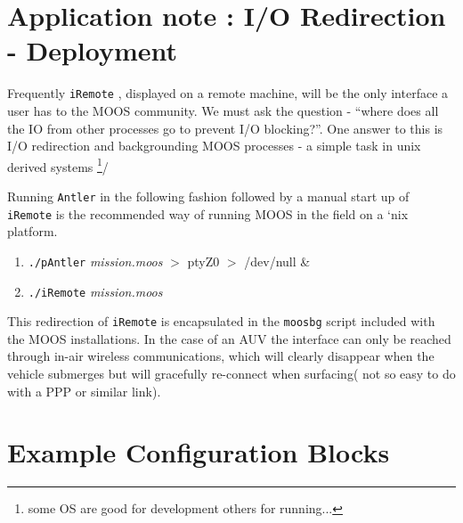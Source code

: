 \documentclass[a4paper,10pt]{article}
\newcommand{\Code}[1]{\texttt{#1} }
\newcommand{\code}[1]{\Code{#1} }
\begin{document}
\section{Application note : I/O Redirection - Deployment} 
Frequently \code{iRemote}, displayed on a remote machine, will be
the only interface a user has to the MOOS community.  We
must ask the question -  ``where does all the IO from other
processes go to prevent I/O blocking?''. One answer to this is I/O
redirection and backgrounding MOOS processes - a simple task in
unix derived systems \footnote{some OS are good for development
others for running...}/

Running \code{Antler} in the following fashion followed by a
manual start up of \code{iRemote} is the recommended way of
running MOOS in the field on a `nix platform.

\begin{enumerate}
\item \code{./pAntler} {\it{mission.moos}} $>$ ptyZ0 $>$ /dev/null \&
\item \code{./iRemote} {\it{mission.moos}}
\end{enumerate}

This redirection of \code{iRemote} is encapsulated in the
\code{moosbg} script included with the MOOS installations. In the
case of an AUV the interface can only be reached  through in-air
wireless communications, which will clearly disappear when the
vehicle submerges but will gracefully re-connect when surfacing(
not so easy to do with a PPP or similar link). 



\section{Example Configuration Blocks}

\end{document}
